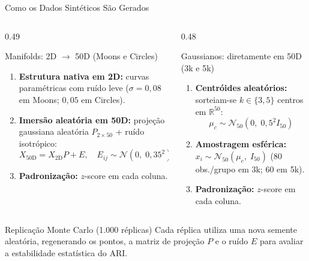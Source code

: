 \documentclass[aspectratio=169,11pt]{beamer}
\begin{document}
\begin{frame}{Como os Dados Sintéticos São Gerados}
  \begin{columns}[T,onlytextwidth]
    \begin{column}{0.49\textwidth}
      \begin{block}{Manifolds: 2D $\longrightarrow$ 50D (Moons e Circles)}
        \footnotesize
        \begin{enumerate}
          \setlength{\itemsep}{2pt}
          \item \textbf{Estrutura nativa em 2D:} curvas paramétricas com ruído leve ($\sigma = 0{,}08$ em Moons; $0{,}05$ em Circles).
          \item \textbf{Imersão aleatória em 50D:} projeção gaussiana aleatória $P_{2\times 50}$ + ruído isotrópico:
                \[
                  X_{50\text{D}} = X_{2\text{D}} P + E, \quad E_{ij} \sim \mathcal{N}(0,\; 0{,}35^2)
                \]
          \item \textbf{Padronização:} $z$-score em cada coluna.
        \end{enumerate}
      \end{block}
    \end{column}
    \begin{column}{0.48\textwidth}
      \begin{block}{Gaussianos: diretamente em 50D (3k e 5k)}
        \footnotesize
        \begin{enumerate}
          \setlength{\itemsep}{2pt}
          \item \textbf{Centróides aleatórios:} sorteiam-se $k \in \{3, 5\}$ centros em $\mathbb{R}^{50}$:
                \[
                  \mu_c \sim \mathcal{N}_{50}(0,\; 0{,}5^2 I_{50})
                \]
          \item \textbf{Amostragem esférica:} $x_i \sim \mathcal{N}_{50}(\mu_c,\; I_{50})$ ($80$ obs./grupo em 3k; $60$ em 5k).
          \item \textbf{Padronização:} $z$-score em cada coluna.
        \end{enumerate}
      \end{block}
    \end{column}
  \end{columns}

  \vspace{0.35em}
  \begin{block}{Replicação Monte Carlo (1{.}000 réplicas)}
    \footnotesize
    Cada réplica utiliza uma nova semente aleatória, regenerando os pontos, a matriz de projeção $P$ e o ruído $E$ para avaliar a estabilidade estatística do ARI.
  \end{block}
\end{frame}
\end{document}
